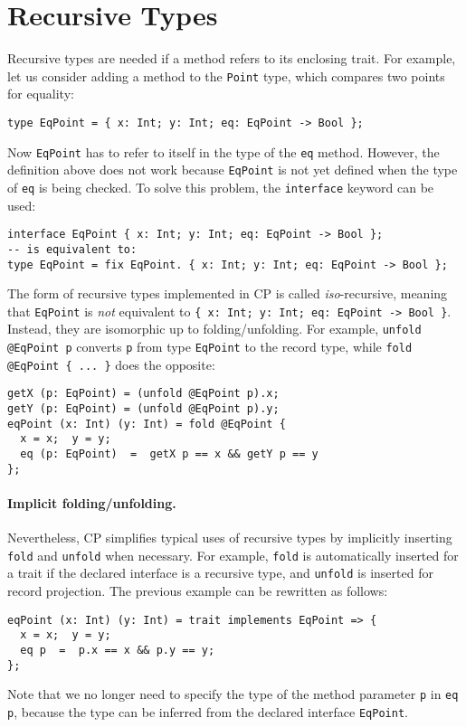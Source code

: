 \section{Recursive Types}

Recursive types are needed if a method refers to its enclosing trait. For
example, let us consider adding a method to the \lstinline{Point} type, which
compares two points for equality:
\begin{lstlisting}
type EqPoint = { x: Int; y: Int; eq: EqPoint -> Bool };
\end{lstlisting}
Now \lstinline{EqPoint} has to refer to itself in the type of the \lstinline{eq}
method. However, the definition above does not work because \lstinline{EqPoint} is
not yet defined when the type of \lstinline{eq} is being checked. To solve this
problem, the \lstinline{interface} keyword can be used:
\begin{lstlisting}
interface EqPoint { x: Int; y: Int; eq: EqPoint -> Bool };
-- is equivalent to:
type EqPoint = fix EqPoint. { x: Int; y: Int; eq: EqPoint -> Bool };
\end{lstlisting}
The form of recursive types implemented in CP is called \emph{iso}-recursive,
meaning that \lstinline{EqPoint} is \emph{not} equivalent to
\lstinline|{ x: Int; y: Int; eq: EqPoint -> Bool }|. Instead, they are isomorphic
up to folding/unfolding. For example, \lstinline{unfold @EqPoint p} converts
\lstinline{p} from type \lstinline{EqPoint} to the record type, while
\lstinline|fold @EqPoint { ... }| does the opposite:
\begin{lstlisting}
getX (p: EqPoint) = (unfold @EqPoint p).x;
getY (p: EqPoint) = (unfold @EqPoint p).y;
eqPoint (x: Int) (y: Int) = fold @EqPoint {
  x = x;  y = y;
  eq (p: EqPoint)  =  getX p == x && getY p == y
};
\end{lstlisting}

\paragraph{Implicit folding/unfolding.}
Nevertheless, CP simplifies typical uses of recursive types by implicitly
inserting \lstinline{fold} and \lstinline{unfold} when necessary. For example,
\lstinline{fold} is automatically inserted for a trait if the declared interface
is a recursive type, and \lstinline{unfold} is inserted for record projection.
The previous example can be rewritten as follows:
\begin{lstlisting}
eqPoint (x: Int) (y: Int) = trait implements EqPoint => {
  x = x;  y = y;
  eq p  =  p.x == x && p.y == y;
};
\end{lstlisting}
Note that we no longer need to specify the type of the method parameter
\lstinline{p} in \lstinline{eq p}, because the type can be inferred from the
declared interface \lstinline{EqPoint}.

